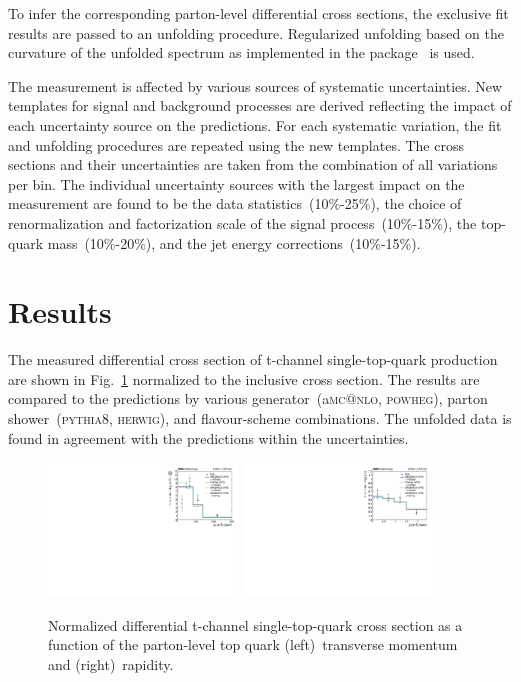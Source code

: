 \documentclass[12pt]{article}
\begin{document}
To infer the corresponding parton-level differential cross sections, the exclusive fit results are passed to an unfolding procedure. Regularized unfolding based on the curvature of the unfolded spectrum as implemented in the \tunfold package~\cite{tunfold} is used. 

The measurement is affected by various sources of systematic uncertainties. New templates for signal and background processes are derived reflecting the impact of each uncertainty source on the predictions. For each systematic variation, the fit and unfolding procedures are repeated using the new templates. The cross sections and their uncertainties are taken from the combination of all variations per bin. The individual uncertainty sources with the largest impact on the measurement are found to be the data statistics~(10\%-25\%), the choice of renormalization and factorization scale of the signal process~(10\%-15\%), the top-quark mass~(10\%-20\%), and the jet energy corrections~(10\%-15\%).

\section{Results}

The measured differential cross section of t-channel single-top-quark production are shown in Fig.~\ref{fig:result} normalized to the inclusive cross section. The results are compared to the predictions by various generator~(a\textsc{mc@nlo}, \textsc{powheg}), parton shower~(\textsc{pythia}8, \textsc{herwig}), and flavour-scheme combinations. The unfolded data is found in agreement with the predictions within the uncertainties.

\begin{figure}[th]
\begin{center}
\includegraphics[width=0.45\textwidth]{figures/result/unfolded_top_pt.pdf}\hspace{0.05\textwidth}
\includegraphics[width=0.45\textwidth]{figures/result/unfolded_top_y.pdf}
\end{center}

\caption{\label{fig:result}Normalized differential t-channel single-top-quark cross section as a function of the parton-level top quark (left)~transverse momentum and (right)~rapidity.}
\end{figure}
\end{document}
